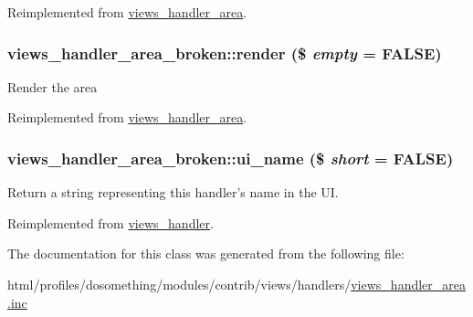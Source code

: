 Reimplemented from \hyperlink{classviews__handler__area_af3615e22fccc744485ddb7978ce812ff}{views\_\-handler\_\-area}.\hypertarget{classviews__handler__area__broken_aa56616948891521539f0f4b59e20307f}{
\subsubsection[{render}]{\setlength{\rightskip}{0pt plus 5cm}views\_\-handler\_\-area\_\-broken::render (\$ {\em empty} = {\ttfamily FALSE})}}
\label{classviews__handler__area__broken_aa56616948891521539f0f4b59e20307f}
Render the area 

Reimplemented from \hyperlink{classviews__handler__area_a9f3eb4b8ee98a0929946e8de7253d302}{views\_\-handler\_\-area}.\hypertarget{classviews__handler__area__broken_a73198c332f1b3e2c9b5fcd719a4f4fb7}{
\subsubsection[{ui\_\-name}]{\setlength{\rightskip}{0pt plus 5cm}views\_\-handler\_\-area\_\-broken::ui\_\-name (\$ {\em short} = {\ttfamily FALSE})}}
\label{classviews__handler__area__broken_a73198c332f1b3e2c9b5fcd719a4f4fb7}
Return a string representing this handler's name in the UI. 

Reimplemented from \hyperlink{classviews__handler_ae81019ed08d9c3f5bca3d16c69e7b39f}{views\_\-handler}.

The documentation for this class was generated from the following file:\begin{DoxyCompactItemize}
\item 
html/profiles/dosomething/modules/contrib/views/handlers/\hyperlink{views__handler__area_8inc}{views\_\-handler\_\-area.inc}\end{DoxyCompactItemize}
